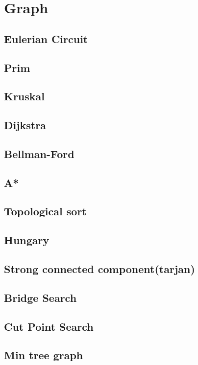 \newpage
\section{Graph}

\subsection{Eulerian Circuit}


\subsection{Prim}


\subsection{Kruskal}


\subsection{Dijkstra}


\subsection{Bellman-Ford}


\subsection{A*}
\subsection{Topological sort}


\subsection{Hungary}


\subsection{Strong connected component(tarjan)}


\subsection{Bridge Search}


\subsection{Cut Point Search}


\subsection{Min tree graph}

